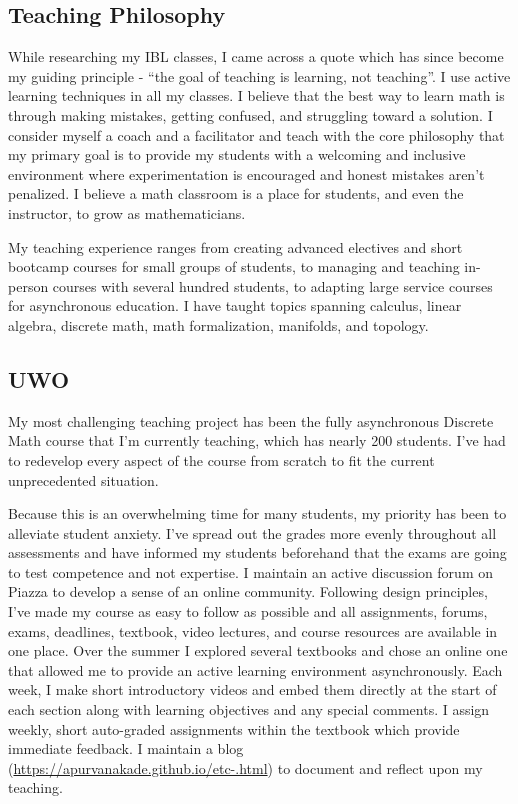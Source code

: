 \subsection*{Teaching Philosophy}
  While researching my IBL classes, I came across a quote which has since become my guiding principle - ``the goal of teaching is learning, not teaching''.
  I use active learning techniques in all my classes. I believe that the best way to learn math is through making mistakes, getting confused, and struggling toward a solution. I consider myself a coach and a facilitator and teach with the core philosophy that my primary goal is to provide my students with a welcoming and inclusive environment where experimentation is encouraged and honest mistakes aren't penalized. I believe a math classroom is a place for students, and even the instructor, to grow as mathematicians.

  My teaching experience ranges from creating advanced electives and short bootcamp courses for small groups of students, to managing and teaching in-person courses with several hundred students, to adapting large service courses for asynchronous education.  I have taught topics spanning calculus, linear algebra, discrete math, math formalization, manifolds, and topology.

\subsection*{UWO}
  My most challenging teaching project has been the fully asynchronous Discrete Math course that I'm currently teaching, which has nearly 200 students. 
  I've had to redevelop every aspect of the course from scratch to fit the current unprecedented situation.

  Because this is an overwhelming time for many students, my priority has been to alleviate student anxiety. 
  I've spread out the grades more evenly throughout all assessments and have informed my students beforehand that the exams are going to test competence and not expertise.
  I maintain an active discussion forum on Piazza to develop a sense of an online community.
  Following design principles, I've made my course as easy to follow as possible and all assignments, forums, exams, deadlines, textbook, video lectures, and course resources are available in one place.
  Over the summer I explored several textbooks and chose an online one that allowed me to provide an active learning environment asynchronously.
  Each week, I make short introductory videos and embed them directly at the start of each section along with learning objectives and any special comments.
  I assign weekly, short auto-graded assignments within the textbook which provide immediate feedback.
  I maintain a blog (\url{https://apurvanakade.github.io/etc-.html}) to document and reflect upon my teaching.

